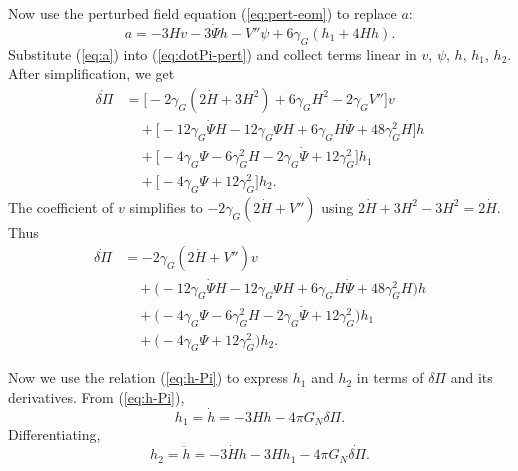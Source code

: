 \documentclass[aps,prd,reprint,superscriptaddress,floatfix]{revtex4-2}
\begin{document}
Now use the perturbed field equation (\ref{eq:pert-eom}) to replace $a$:
\begin{equation}
a = -3H v -3\dot\Psi h - V'' \psi +6\gamma_G(h_1+4H h).
\label{eq:a}
\end{equation}
Substitute (\ref{eq:a}) into (\ref{eq:dotPi-pert}) and collect terms linear in $v$, $\psi$, $h$, $h_1$, $h_2$. After simplification, we get
\begin{align}
\dot{\delta\Pi} &= \big[ -2\gamma_G(2\dot H+3H^2) +6\gamma_G H^2 -2\gamma_G V'' \big] v \nonumber\\
&\quad + \big[ -12\gamma_G\dot\Psi H -12\gamma_G\Psi H +6\gamma_G H\dot\Psi +48\gamma_G^2 H \big] h \nonumber\\
&\quad + \big[ -4\gamma_G\Psi -6\gamma_G^2 H -2\gamma_G\dot\Psi +12\gamma_G^2 \big] h_1 \nonumber\\
&\quad + \big[ -4\gamma_G\Psi +12\gamma_G^2 \big] h_2.
\label{eq:dotPi-linear}
\end{align}
The coefficient of $v$ simplifies to $-2\gamma_G(2\dot H + V'')$ using $2\dot H+3H^2 -3H^2 = 2\dot H$. Thus
\begin{align}
\dot{\delta\Pi} &= -2\gamma_G(2\dot H + V'') v \nonumber\\
&\quad + \big( -12\gamma_G\dot\Psi H -12\gamma_G\Psi H +6\gamma_G H\dot\Psi +48\gamma_G^2 H \big) h \nonumber\\
&\quad + \big( -4\gamma_G\Psi -6\gamma_G^2 H -2\gamma_G\dot\Psi +12\gamma_G^2 \big) h_1 \nonumber\\
&\quad + \big( -4\gamma_G\Psi +12\gamma_G^2 \big) h_2.
\label{eq:dotPi-simple}
\end{align}

Now we use the relation (\ref{eq:h-Pi}) to express $h_1$ and $h_2$ in terms of $\delta\Pi$ and its derivatives. From (\ref{eq:h-Pi}),
\begin{equation}
h_1 = \dot h = -3H h -4\pi G_N \delta\Pi.
\label{eq:h1}
\end{equation}
Differentiating,
\begin{equation}
h_2 = \ddot h = -3\dot H h -3H h_1 -4\pi G_N \dot{\delta\Pi}.
\label{eq:h2}
\end{equation}
\end{document}
